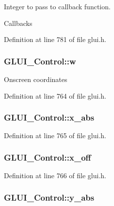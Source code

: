Integer to pass to callback function. 

Callbacks 

Definition at line 781 of file glui.\+h.

\hypertarget{class_g_l_u_i___control_aca82a099b9cbbadb188794cbfb06aa27}{
\subsubsection[{w}]{ G\+L\+U\+I\+\_\+\+Control\+::w}}\label{class_g_l_u_i___control_aca82a099b9cbbadb188794cbfb06aa27}
Onscreen coordinates 

Definition at line 764 of file glui.\+h.

\hypertarget{class_g_l_u_i___control_a7f0f98737828ad255401f642826fbd7e}{
\subsubsection[{x\+\_\+abs}]{ G\+L\+U\+I\+\_\+\+Control\+::x\+\_\+abs}}\label{class_g_l_u_i___control_a7f0f98737828ad255401f642826fbd7e}


Definition at line 765 of file glui.\+h.

\hypertarget{class_g_l_u_i___control_a853d95e48b8bd6d2bdd41dabc2b1a1a6}{
\subsubsection[{x\+\_\+off}]{ G\+L\+U\+I\+\_\+\+Control\+::x\+\_\+off}}\label{class_g_l_u_i___control_a853d95e48b8bd6d2bdd41dabc2b1a1a6}


Definition at line 766 of file glui.\+h.

\hypertarget{class_g_l_u_i___control_a54a7a5a7c37e5c0e0a3154bac7ddb049}{
\subsubsection[{y\+\_\+abs}]{ G\+L\+U\+I\+\_\+\+Control\+::y\+\_\+abs}}\label{class_g_l_u_i___control_a54a7a5a7c37e5c0e0a3154bac7ddb049}


